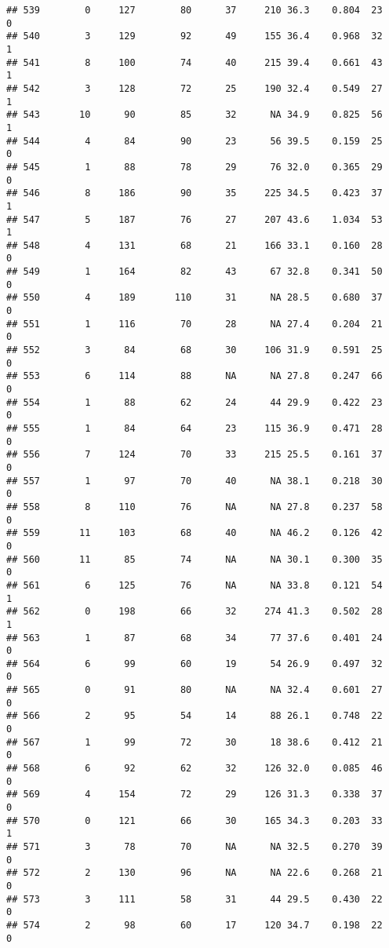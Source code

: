 \documentclass[
]{article}
\begin{document}
\begin{verbatim}
## 539        0     127        80      37     210 36.3    0.804  23    0
## 540        3     129        92      49     155 36.4    0.968  32    1
## 541        8     100        74      40     215 39.4    0.661  43    1
## 542        3     128        72      25     190 32.4    0.549  27    1
## 543       10      90        85      32      NA 34.9    0.825  56    1
## 544        4      84        90      23      56 39.5    0.159  25    0
## 545        1      88        78      29      76 32.0    0.365  29    0
## 546        8     186        90      35     225 34.5    0.423  37    1
## 547        5     187        76      27     207 43.6    1.034  53    1
## 548        4     131        68      21     166 33.1    0.160  28    0
## 549        1     164        82      43      67 32.8    0.341  50    0
## 550        4     189       110      31      NA 28.5    0.680  37    0
## 551        1     116        70      28      NA 27.4    0.204  21    0
## 552        3      84        68      30     106 31.9    0.591  25    0
## 553        6     114        88      NA      NA 27.8    0.247  66    0
## 554        1      88        62      24      44 29.9    0.422  23    0
## 555        1      84        64      23     115 36.9    0.471  28    0
## 556        7     124        70      33     215 25.5    0.161  37    0
## 557        1      97        70      40      NA 38.1    0.218  30    0
## 558        8     110        76      NA      NA 27.8    0.237  58    0
## 559       11     103        68      40      NA 46.2    0.126  42    0
## 560       11      85        74      NA      NA 30.1    0.300  35    0
## 561        6     125        76      NA      NA 33.8    0.121  54    1
## 562        0     198        66      32     274 41.3    0.502  28    1
## 563        1      87        68      34      77 37.6    0.401  24    0
## 564        6      99        60      19      54 26.9    0.497  32    0
## 565        0      91        80      NA      NA 32.4    0.601  27    0
## 566        2      95        54      14      88 26.1    0.748  22    0
## 567        1      99        72      30      18 38.6    0.412  21    0
## 568        6      92        62      32     126 32.0    0.085  46    0
## 569        4     154        72      29     126 31.3    0.338  37    0
## 570        0     121        66      30     165 34.3    0.203  33    1
## 571        3      78        70      NA      NA 32.5    0.270  39    0
## 572        2     130        96      NA      NA 22.6    0.268  21    0
## 573        3     111        58      31      44 29.5    0.430  22    0
## 574        2      98        60      17     120 34.7    0.198  22    0

\end{verbatim}
\end{document}
